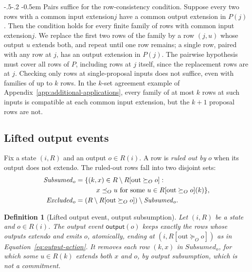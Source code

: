 \documentclass[sigconf]{cidr-2027}
\makeatletter
\newtheorem{definition}{Definition}
\theoremstyle{remark}
\renewcommand\paragraph{\@startsection{paragraph}{4}{\z@}%
  {-.5\baselineskip \@plus -2\p@ \@minus -.2\p@}%
  {-0.5em}%
  {\normalfont\bfseries}}
\newcommand{\OutputOrd}{\preceq_O}
\newcommand{\OutputGe}{\succeq_O}
\newcommand{\commitment}{commitment\xspace}
\newcommand{\indesc}{input extension\xspace} %
\newcommand{\outrel}{extends\xspace}          %
\newcommand{\outrelbase}{extend\xspace}       %
\newcommand{\outnoun}{output extension\xspace}%
\newcommand{\fiber}[1]{P(#1)}
\newcommand{\Subsumed}{\mathit{Subsumed}}
\newcommand{\Excluded}{\mathit{Excluded}}
\makeatother
\begin{document}
\paragraph{Pairs suffice for the row-consistency condition.}
\label{app:pairs-suffice}
Suppose every two rows with a common \indesc $j$ have a common \outnoun in
$\fiber{j}$. Then the condition holds for every finite family of rows with
common \indesc $j$. We replace the first two rows of the family by a row
$(j,u)$ whose output $u$ \outrel both, and repeat until one row remains; a
single row, paired with any row at $j$, has an \outnoun in $\fiber{j}$. The
pairwise hypothesis must cover all rows of $P$, including rows at $j$ itself,
since the replacement rows are at $j$. Checking only rows at single-proposal
inputs does not suffice, even with families of up to $k$ rows. In the
$k$-set agreement example of Appendix~\ref{app:additional-applications},
every family of at most $k$ rows at such inputs is compatible at each common
\indesc, but the $k+1$ proposal rows are not.

\subsection{Lifted output events}
\label{app:lifted-output-events}

Fix a state $(i,R)$ and an output $o\in R(i)$. A row is \emph{ruled out by}
$o$ when its output does not \outrelbase $o$. The ruled-out rows fall into two
disjoint sets:
\begin{align}
  \Subsumed_o&=\{(k,x)\in R\setminus R[\mathrm{out}\OutputGe o]:\notag\\
    &\qquad\quad x\OutputOrd u\text{ for some }u\in R[\mathrm{out}\OutputGe o](k)\},
      \label{eq:output-subsumptions}\\
  \Excluded_o&=(R\setminus R[\mathrm{out}\OutputGe o])\setminus\Subsumed_o.
      \label{eq:commitment-removals}
\end{align}

\begin{definition}[Lifted output event, output subsumption]
\label{def:lifted-output-event}
Let $(i,R)$ be a state and $o\in R(i)$. The \emph{output event}
$\mathsf{output}(o)$ keeps exactly the rows whose outputs \outrelbase $o$ and
emits $o$, atomically, ending at $(i,R[\mathrm{out}\OutputGe o])$ as in
Equation~\ref{eq:output-action}. It removes each row $(k,x)$ in
$\Subsumed_o$, for which some $u\in R(k)$ \outrel both $x$ and $o$, by
\emph{output subsumption}, which is not a \commitment.
\end{definition}
\end{document}

